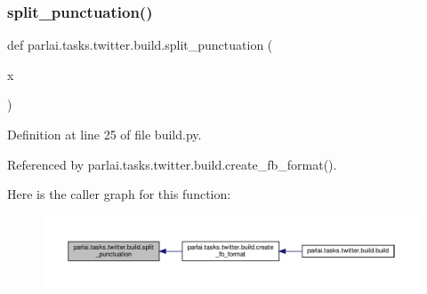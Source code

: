 \mbox{\label{namespaceparlai_1_1tasks_1_1twitter_1_1build_a6296215f669301c1e46b7588e1291ae7}} 
\subsubsection{\texorpdfstring{split\+\_\+punctuation()}{split\_punctuation()}}
{\footnotesize\ttfamily def parlai.\+tasks.\+twitter.\+build.\+split\+\_\+punctuation (\begin{DoxyParamCaption}\item[{}]{x }\end{DoxyParamCaption})}



Definition at line 25 of file build.\+py.



Referenced by parlai.\+tasks.\+twitter.\+build.\+create\+\_\+fb\+\_\+format().

Here is the caller graph for this function\+:
\nopagebreak
\begin{figure}[H]
\begin{center}
\leavevmode
\includegraphics[width=350pt]{namespaceparlai_1_1tasks_1_1twitter_1_1build_a6296215f669301c1e46b7588e1291ae7_icgraph}
\end{center}
\end{figure}
